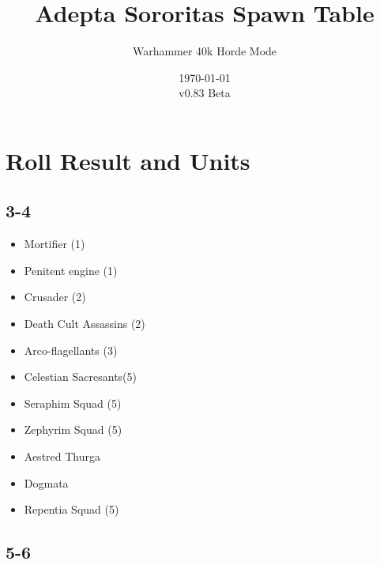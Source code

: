 \documentclass{HordeModeTarot}
\title{Adepta Sororitas Spawn Table}
\author{Warhammer 40k Horde Mode}
\date{\today \\v0.83 Beta}
\begin{document}
\maketitle

\outputUsingSpawnTableBoilerplate
\section{Roll Result and Units}\hypertarget{roll-results}{}\label{roll-results}

\begin{multicols}{2}

\subsection*{3-4}

\begin{itemize}[leftmargin=*]
\item[] Mortifier (1)
\item[] Penitent engine (1)
\item[] Crusader (2)
\item[] Death Cult Assassins (2)
\item[] Arco-flagellants (3)
\item[] Celestian Sacresants(5)
\item[] Seraphim Squad (5)
\item[] Zephyrim Squad (5)
\item[] Aestred Thurga
\item[] Dogmata
\item[] Repentia Squad (5)
\end{itemize}

\subsection*{5-6}


\end{multicols}
\end{document}
